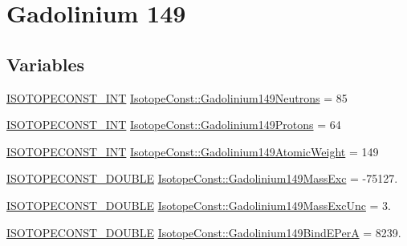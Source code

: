 \hypertarget{group___isotope_const-_gadolinium-_gd149}{}\section{Gadolinium 149}
\label{group___isotope_const-_gadolinium-_gd149}
\subsection*{Variables}
\begin{DoxyCompactItemize}
\item 
\mbox{\hyperlink{group___isotope_const-_macros_ga5f18360b3e99483a35c32d789e62621c}{I\+S\+O\+T\+O\+P\+E\+C\+O\+N\+S\+T\+\_\+\+I\+NT}} \mbox{\hyperlink{group___isotope_const-_gadolinium-_gd149_ga5a9951856e60926594c003224c7057c8}{Isotope\+Const\+::\+Gadolinium149\+Neutrons}} = 85
\item 
\mbox{\hyperlink{group___isotope_const-_macros_ga5f18360b3e99483a35c32d789e62621c}{I\+S\+O\+T\+O\+P\+E\+C\+O\+N\+S\+T\+\_\+\+I\+NT}} \mbox{\hyperlink{group___isotope_const-_gadolinium-_gd149_ga38189f9fd34c46d5a16899d047b986ea}{Isotope\+Const\+::\+Gadolinium149\+Protons}} = 64
\item 
\mbox{\hyperlink{group___isotope_const-_macros_ga5f18360b3e99483a35c32d789e62621c}{I\+S\+O\+T\+O\+P\+E\+C\+O\+N\+S\+T\+\_\+\+I\+NT}} \mbox{\hyperlink{group___isotope_const-_gadolinium-_gd149_gaf5f32e852bda3c5669a7304e692b4409}{Isotope\+Const\+::\+Gadolinium149\+Atomic\+Weight}} = 149
\item 
\mbox{\hyperlink{group___isotope_const-_macros_ga8f45a7272ce02c0b4c65c44636ed719a}{I\+S\+O\+T\+O\+P\+E\+C\+O\+N\+S\+T\+\_\+\+D\+O\+U\+B\+LE}} \mbox{\hyperlink{group___isotope_const-_gadolinium-_gd149_gab9e78547869c97c34cd596ac12a39845}{Isotope\+Const\+::\+Gadolinium149\+Mass\+Exc}} = -\/75127.
\item 
\mbox{\hyperlink{group___isotope_const-_macros_ga8f45a7272ce02c0b4c65c44636ed719a}{I\+S\+O\+T\+O\+P\+E\+C\+O\+N\+S\+T\+\_\+\+D\+O\+U\+B\+LE}} \mbox{\hyperlink{group___isotope_const-_gadolinium-_gd149_ga1751243b0f1e30f461a17e6fe2ca3293}{Isotope\+Const\+::\+Gadolinium149\+Mass\+Exc\+Unc}} = 3.
\item 
\mbox{\hyperlink{group___isotope_const-_macros_ga8f45a7272ce02c0b4c65c44636ed719a}{I\+S\+O\+T\+O\+P\+E\+C\+O\+N\+S\+T\+\_\+\+D\+O\+U\+B\+LE}} \mbox{\hyperlink{group___isotope_const-_gadolinium-_gd149_ga9ff328b7683886a3dd952894a39f248f}{Isotope\+Const\+::\+Gadolinium149\+Bind\+E\+PerA}} = 8239.
\item 

\end{DoxyCompactItemize}
